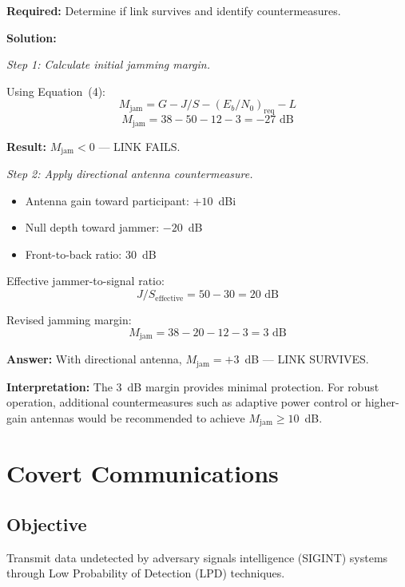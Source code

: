 \textbf{Required:} Determine if link survives and identify countermeasures.

\textbf{Solution:}

\textit{Step 1: Calculate initial jamming margin.}

Using Equation~(4):
\begin{equation}
M_{\text{jam}} = G - J/S - (E_b/N_0)_{\text{req}} - L
\end{equation}
\begin{equation}
M_{\text{jam}} = 38 - 50 - 12 - 3 = -27 \text{ dB}
\end{equation}

\textbf{Result:} $M_{\text{jam}} < 0$ --- LINK FAILS.

\textit{Step 2: Apply directional antenna countermeasure.}
\begin{itemize}
\item Antenna gain toward participant: $+10$~dBi
\item Null depth toward jammer: $-20$~dB
\item Front-to-back ratio: 30~dB
\end{itemize}

Effective jammer-to-signal ratio:
\begin{equation}
J/S_{\text{effective}} = 50 - 30 = 20 \text{ dB}
\end{equation}

Revised jamming margin:
\begin{equation}
M_{\text{jam}} = 38 - 20 - 12 - 3 = 3 \text{ dB}
\end{equation}

\textbf{Answer:} With directional antenna, $M_{\text{jam}} = +3$~dB --- LINK SURVIVES.

\textbf{Interpretation:} The 3~dB margin provides minimal protection. For robust operation, additional countermeasures such as adaptive power control or higher-gain antennas would be recommended to achieve $M_{\text{jam}} \geq 10$~dB.

\section{Covert Communications}

\subsection{Objective}

Transmit data undetected by adversary signals intelligence (SIGINT) systems through Low Probability of Detection (LPD) techniques.

